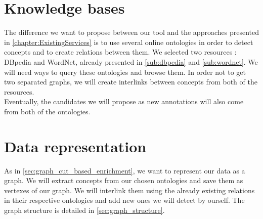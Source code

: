\section{Knowledge bases} %
\label{sec:knowledge_bases}
The difference we want to propose between our tool and the approaches presented in \ref{chapter:ExistingServices} is to use several online ontologies in order to detect concepts and to create relations between them. We selected two resources : DBpedia and WordNet, already presented in \ref{sub:dbpedia} and \ref{sub:wordnet}. We will need ways to query these ontologies and browse them. In order not to get two separated graphs, we will create interlinks between concepts from both of the resources.\\
Eventually, the candidates we will propose as new annotations will also come from both of the ontologies. 

\section{Data representation} %
\label{sec:data_representation}
As in \ref{sec:graph_cut_based_enrichment}, we want to represent our data as a graph. We will extract concepts from our chosen ontologies and save them as vertexes of our graph. We will interlink them using the already existing relations in their respective ontologies and add new ones we will detect by ourself. The graph structure is detailed in \ref{sec:graph_structure}.
